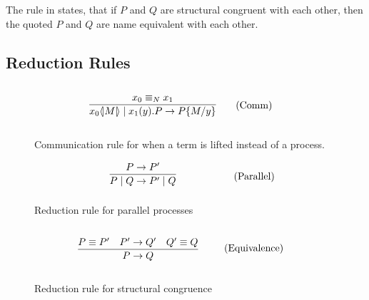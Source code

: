 \noindent
The rule in  states, that if $P$ and $Q$ are structural congruent with each other, then the quoted $P$ and $Q$ are name equivalent with each other.

\FloatBarrier

\subsection{Reduction Rules}

\begin{figure}[h]
	\begin{align}
	& \infrule{x_0 \equiv_N x_1}{\lift{x_0}{M}\para\inp{x_1}{y}P\ra P\{M/y\}} \tag{Comm}
	\end{align}
	\caption{Communication rule for when a term is lifted instead of a process.}
	\label{fig:com}
\end{figure}


\begin{figure}[!h]
	\begin{align}
	& \infrule{P\ra P'}{P\para Q\ra P'\para Q} \tag{Parallel}
	\end{align}
	\caption{Reduction rule for parallel processes}
	\label{fig:para}
\end{figure}

\begin{figure}[h]
	\begin{align}
		& \infrule{P\equiv P'\quad P'\ra Q'\quad Q'\equiv Q}{P\ra Q} \tag{Equivalence}
	\end{align}
	\caption{Reduction rule for structural congruence}
	\label{fig:equi}
\end{figure}


